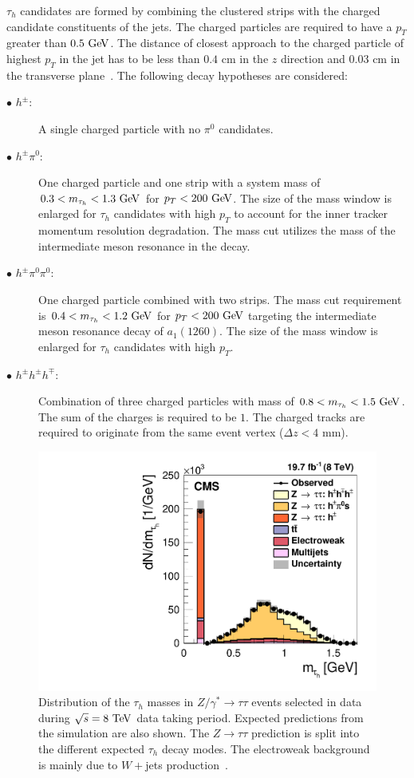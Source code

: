 $\tau_{h}$ candidates are formed by combining the clustered strips with the charged candidate constituents of the jets. The charged particles are required to have a $p_{T}$ greater than $0.5~\mathrm{Ge\kern -0.1em V}$. The distance of closest approach to the charged particle of highest $p_{T}$ in the jet has to be less than $0.4$ cm in the $z$ direction and $0.03$ cm in the transverse plane~\cite{1748-0221-11-01-P01019}. The following decay hypotheses are considered:

\begin{description}
\item[$\bullet$ $h^{\pm}$:] A single charged particle with no $\pi^{0}$ candidates.  
\item[$\bullet$ $h^{\pm} \pi^{0}$:] One charged particle and one strip with a system mass of $0.3<m_{\tau_{h}}<1.3~\mathrm{Ge\kern -0.1em V}$ for $p_{T}<200~\mathrm{Ge\kern -0.1em V}$. The size of the mass window is enlarged for $\tau_{h}$ candidates with high $p_{T}$ to account for the inner tracker momentum resolution degradation. The mass cut utilizes the mass of the intermediate meson resonance in the decay. 
\item[$\bullet$ $h^{\pm} \pi^{0}  \pi^{0}$:] One charged particle combined with two strips. The mass cut requirement is $0.4<m_{\tau_{h}}<1.2~\mathrm{Ge\kern -0.1em V}$ for $p_{T}<200~\mathrm{Ge\kern -0.1em V}$ targeting the intermediate meson resonance decay of $a_{1} (1260)$.  The size of the mass window is enlarged for $\tau_{h}$ candidates with high $p_{T}$.
\item[$\bullet$ $h^{\pm} h^{\pm} h^{\mp}$:] Combination of three charged particles with mass of $0.8<m_{\tau_{h}
}<1.5~\mathrm{Ge\kern -0.1em V}$. The sum of the charges is required to be $1$. The charged tracks are required to originate from the same event vertex ($\Delta z< 4$ mm).
\end{description}

\begin{figure}[h]
\centering
\includegraphics[width=0.80\columnwidth]{figures_chapter4/tau_mass}
\caption{Distribution of the $\tau_{h}$ masses in $Z/\gamma^{*} \rightarrow \tau\tau$ events selected in data during $\sqrt{s}=8~\mathrm{Te\kern -0.1em V}$ data taking period. Expected predictions from the simulation are also shown. The $Z \rightarrow \tau\tau$ prediction is split into the different expected $\tau_{h}$ decay modes. The electroweak background is mainly due to $W+$jets production~\cite{1748-0221-11-01-P01019}.}
\label{fig:tau_mass}
\end{figure}

